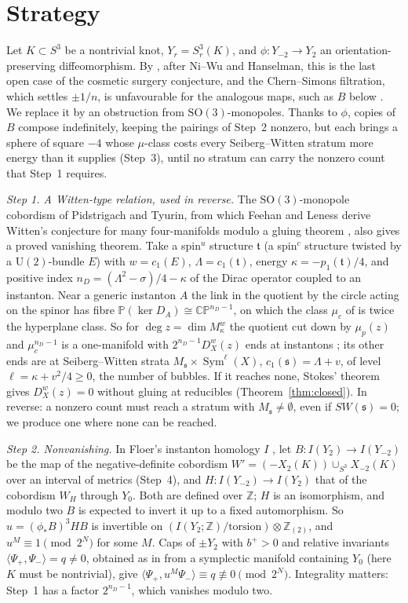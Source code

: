 \documentclass[10pt]{amsart}
\numberwithin{equation}{section}
\theoremstyle{compact}
\newcommand{\CP}{\mathbb{CP}}
\newcommand{\Z}{\mathbb Z}
\newcommand{\Sym}{\operatorname{Sym}}
\newcommand{\SO}{\mathrm{SO}}
\newcommand{\fs}{\mathfrak s}
\newcommand{\ft}{\mathfrak t}
\newcommand{\step}[1]{\par\noindent\textit{#1}\enspace}
\begin{document}
\section{Strategy}

Let $K\subset S^3$ be a nontrivial knot, $Y_r=S^3_r(K)$, and
$\phi\colon Y_{-2}\to Y_2$ an orientation-preserving diffeomorphism. By
\cite[Cor.~1.4]{DLME}, after Ni--Wu and Hanselman, this is the last open case
of the cosmetic surgery conjecture, and the Chern--Simons filtration, which
settles $\pm1/n$, is unfavourable for the analogous maps, such as $B$ below
\cite[\S1.2]{DLME}. We replace it by an obstruction from $\SO(3)$-monopoles. Thanks to $\phi$,
copies of $B$ compose indefinitely, keeping the pairings of
Step~2 nonzero, but each brings a sphere of square $-4$ whose $\mu$-class
costs every Seiberg--Witten stratum more energy than it supplies (Step~3),
until no stratum can carry the nonzero count that Step~1 requires.

\step{Step 1. A Witten-type relation, used in reverse.}
The $\SO(3)$-monopole cobordism of Pidstrigach and Tyurin, from which Feehan
and Leness derive Witten's conjecture \cite{W} for many four-manifolds
modulo a gluing theorem \cite{PT,FLM,FL6}, also gives a proved vanishing
theorem. Take a spin$^u$ structure $\ft$ (a spin$^c$ structure
twisted by a $\mathrm U(2)$-bundle $E$) with $w=c_1(E)$, $\Lambda=c_1(\ft)$,
energy $\kappa=-p_1(\ft)/4$, and positive index
$n_D=(\Lambda^2-\sigma)/4-\kappa$ of the Dirac operator coupled to an
instanton. Near a generic instanton $A$ the link in the quotient by the circle
acting on the spinor has fibre $\mathbb P(\ker D_A)\cong\CP^{n_D-1}$, on which the
class $\mu_c$ of \cite{FL2b} is twice the hyperplane class. So for $\deg
z=\dim M^w_\kappa$ the quotient cut down by $\mu_p(z)$ and $\mu_c^{n_D-1}$ is a
one-manifold with $2^{n_D-1}D^w_X(z)$ ends at instantons
\cite[Prop.~3.29]{FL2b}; its other ends are at Seiberg--Witten strata
$M_\fs\times\Sym^\ell(X)$, $c_1(\fs)=\Lambda+v$, of level
$\ell=\kappa+v^2/4\ge0$, the number of bubbles. If it reaches none,
Stokes' theorem gives $D^w_X(z)=0$ without gluing at reducibles
(Theorem~\ref{thm:closed}). In reverse: a nonzero count must reach a
stratum with $M_\fs\neq\emptyset$, even if $SW(\fs)=0$; we produce one where
none can be reached.

\step{Step 2. Nonvanishing.}
In Floer's instanton homology $I$ \cite{DLME}, let $B\colon I(Y_2)\to
I(Y_{-2})$ be the map of the negative-definite cobordism
$W'=(-X_2(K))\cup_{S^3}X_{-2}(K)$ over an interval of metrics (Step~4), and
$H\colon I(Y_{-2})\to I(Y_2)$ that of the cobordism $W_H$ through $Y_0$. Both
are defined over $\Z$; $H$ is an isomorphism, and modulo two $B$ is expected to invert
it up to a fixed automorphism. So $u=(\phi_*B)^3HB$ is invertible on
$(I(Y_2;\Z)/\text{torsion})\otimes\Z_{(2)}$, and $u^M\equiv1\pmod{2^N}$ for
some $M$. Caps of $\pm Y_2$ with $b^+>0$ and relative
invariants $\langle\Psi_+,\Psi_-\rangle=q\neq0$, obtained as in \cite{KM04}
from a symplectic manifold containing $Y_0$ (here $K$ must be nontrivial),
give
$\langle\Psi_+,u^M\Psi_-\rangle\equiv q\not\equiv0\pmod{2^N}$. Integrality
matters: Step~1 has a factor $2^{n_D-1}$, which vanishes modulo two.
\end{document}
